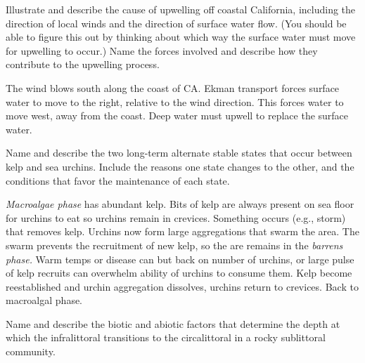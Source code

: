 \documentclass[11pt, addpoints]{exam}
\newenvironment{AnswerPage}[1]
    {\begin{minipage}[t][#1]{0.92\textwidth}%
    \begin{solution}}
    {\end{solution}\end{minipage}
    \vspace{\stretch{1}}}
\begin{document}
\begin{questions}
\question[10]
Illustrate and describe the cause of upwelling off coastal California, including the direction of local winds and the direction of surface water flow. (You should be able to figure this out by thinking about which way the surface water must move for upwelling to occur.) Name the forces involved and describe how they contribute to the upwelling process. %

\begin{AnswerPage}{3in}

The wind blows south along the coast of CA. Ekman transport forces surface water to move to the right, relative to the wind direction. This forces water to move west, away from the coast. Deep water must upwell to replace the surface water.

\end{AnswerPage}

\newpage


\question[10]
Name and describe the two long-term alternate stable states that occur between kelp and sea urchins. Include the reasons one state changes to the other, and the conditions that favor the maintenance of each state.

\begin{AnswerPage}{2in}
\emph{Macroalgae phase} has abundant kelp. Bits of kelp are always present on sea floor for urchins to eat so urchins remain in crevices. Something occurs (e.g., storm) that removes kelp. Urchins now form large aggregations that swarm the area. The swarm prevents the recruitment of new kelp, so the are remains in the \emph{barrens phase.} Warm temps or disease can but back on number of urchins, or large pulse of kelp recruits can overwhelm ability of urchins to consume them. Kelp become reestablished and urchin aggregation dissolves, urchins return to crevices. Back to macroalgal phase.
\end{AnswerPage}


\question[10]
Name and describe the biotic and abiotic factors that determine the depth at which the infralittoral transitions to the circalittoral in a rocky sublittoral community.

\begin{AnswerPage}{0.2\textheight}

\end{AnswerPage}

\newpage


\end{questions}
\end{document}
